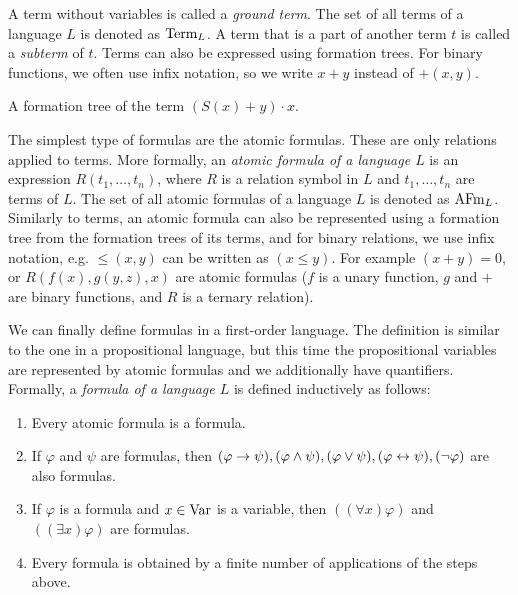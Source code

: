 A term without variables is called a \emph{ground term}. The set of all terms of a language $L$ is denoted as $\operatorname{Term}_L$. A term that is a part of another term $t$ is called a \emph{subterm} of $t$. Terms can also be expressed using formation trees. For binary functions, we often use infix notation, so we write $x+y$ instead of $+(x,y)$.

\begin{marginfigure}[-6\baselineskip]
\centering
{}
\caption{A formation tree of the term $(S(x) + y)\cdot x$.}
\end{marginfigure}

The simplest type of formulas are the atomic formulas. These are only relations applied to terms. More formally, an \emph{atomic formula of a language $L$} is an expression $R(t_1, \dots, t_n)$, where $R$ is a relation symbol in $L$ and $t_1, \dots, t_n$ are terms of $L$. The set of all atomic formulas of a language $L$ is denoted as $\operatorname{AFm}_L$. Similarly to terms, an atomic formula can also be represented using a formation tree from the formation trees of its terms, and for binary relations, we use infix notation, e.g. $\leq(x, y)$ can be written as $(x \leq y)$. For example $(x + y) = 0$, or $R(f(x), g(y,z), x)$ are atomic formulas ($f$ is a unary function, $g$ and $+$ are binary functions, and $R$ is a ternary relation).

We can finally define formulas in a first-order language. The definition is similar to the one in a propositional language, but this time the propositional variables are represented by atomic formulas and we additionally have quantifiers. Formally, a \emph{formula of a language $L$} is defined inductively as follows:
\begin{enumerate}
  \item Every atomic formula is a formula.
  \item If $\varphi$ and $\psi$ are formulas, then $(\varphi \to \psi), (\varphi \land \psi), (\varphi \lor \psi), (\varphi \leftrightarrow \psi), (\neg \varphi)$ are also formulas.
  \item If $\varphi$ is a formula and $x \in \operatorname{Var}$ is a variable, then $((\forall x)\varphi)$ and $((\exists x)\varphi)$ are formulas.
  \item Every formula is obtained by a finite number of applications of the steps above.
\end{enumerate}

